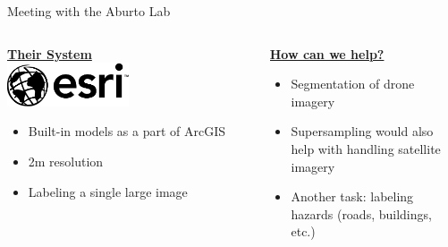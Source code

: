 \begin{frame}{Meeting with the Aburto Lab}
    \begin{columns}
        \begin{column}{0.5\textwidth}
            \textbf{\uline{Their System}}\\
            \includegraphics[width=0.5\textwidth]{images/esri.png}
            \begin{itemize}
                \item Built-in models as a part of ArcGIS
                \item 2m resolution
                \item Labeling a single large image
            \end{itemize}
        \end{column}
        \begin{column}{0.5\textwidth}
            \textbf{\uline{How can we help?}}\\
            \begin{itemize}
                \item Segmentation of drone imagery
                \item Supersampling would also help with handling satellite imagery
                \item Another task: labeling hazards (roads, buildings, etc.)
            \end{itemize}
        \end{column}
    \end{columns}
\end{frame}

